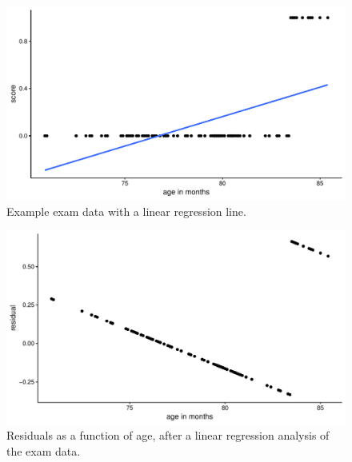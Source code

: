 \documentclass[]{book}\usepackage[]{graphicx}\usepackage[]{color}
\makeatletter
\def\maxwidth{ %
  \ifdim\Gin@nat@width>\linewidth
    \linewidth
  \else
    \Gin@nat@width
  \fi
}
\newenvironment{knitrout}{}{} %
\makeatother
\begin{document}
\begin{knitrout}
\color{fgcolor}\begin{figure}

{\centering \includegraphics[width=\maxwidth]{figure/gen_6-1} 

}

\caption[Example exam data with a linear regression line]{Example exam data with a linear regression line.}\label{fig:gen_6}
\end{figure}


\end{knitrout}
% 
% 
\begin{knitrout}
\color{fgcolor}\begin{figure}

{\centering \includegraphics[width=\maxwidth]{figure/gen_7-1} 

}

\caption[Residuals as a function of age, after a linear regression analysis of the exam data]{Residuals as a function of age, after a linear regression analysis of the exam data.}\label{fig:gen_7}
\end{figure}


\end{knitrout}
\end{document}
